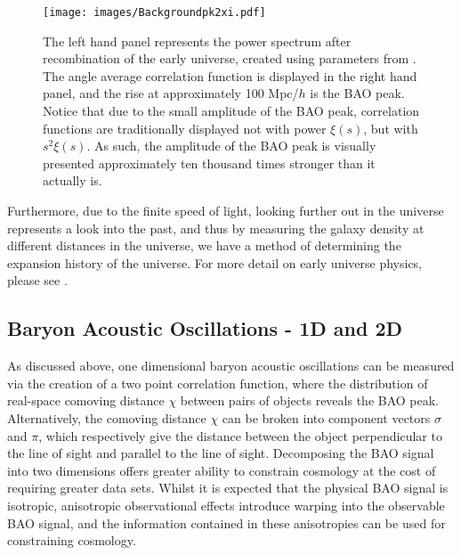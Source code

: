 \documentclass[titlesmallcaps, examinerscopy, copyrightpage]{uqthesis}
\begin{document}
\begin{figure}[h!]
  \begin{center}
    \texttt{[image: images/Backgroundpk2xi.pdf]}
  \end{center}
  \caption{The left hand panel represents the power spectrum after recombination of the early universe, created using parameters from \citet{Planck201416}. The angle average correlation function is displayed in the right hand panel, and the rise at approximately 100 Mpc/$h$ is the BAO peak. Notice that due to the small amplitude of the BAO peak, correlation functions are traditionally displayed not with power $\xi(s)$, but with $s^2 \xi(s)$. As such, the amplitude of the BAO peak is visually presented approximately ten thousand times stronger than it actually is.}
  \label{fig:Backgroundpk2xi}
\end{figure}



Furthermore, due to the finite speed of light, looking further out in the universe represents a look into the past, and thus by measuring the galaxy density at different distances in the universe, we have a method of determining the expansion history of the universe. For more detail on early universe physics, please see \citet{BashinskyBertschinger2001,BashinskyBertschinger2002}.



\subsection{Baryon Acoustic Oscillations - 1D and 2D}

As discussed above, one dimensional baryon acoustic oscillations can be measured via the creation of a two point correlation function, where the distribution of real-space comoving distance $\chi$ between pairs of objects reveals the BAO peak. Alternatively, the comoving distance $\chi$ can be broken into component vectors $\sigma$ and $\pi$, which respectively give the distance between the object perpendicular to the line of sight and parallel to the line of sight. Decomposing the BAO signal into two dimensions offers greater ability to constrain cosmology at the cost of requiring greater data sets. Whilst it is expected that the physical BAO signal is isotropic, anisotropic observational effects introduce warping into the observable BAO signal, and the information contained in these anisotropies can be used for constraining cosmology. 
\end{document}
